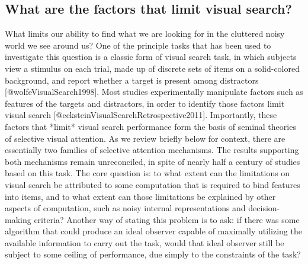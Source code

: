 \documentclass[10pt,letterpaper]{article}
\begin{document}
\subsection{What are the factors that limit visual search?}
What limits our ability to find what we are looking for in the cluttered noisy world we 
see around us? One of the principle tasks that has been used to investigate this question
is a classic form of visual search task, in which subjects view a stimulus on each trial, 
made up of discrete sets of items on a solid-colored background, and report whether a 
target is present among distractors [@wolfeVisualSearch1998]. 
Most studies experimentally manipulate factors such as features of the targets and 
distractors, in order to identify those factors limit visual search 
[@ecksteinVisualSearchRetrospective2011]. Importantly, these factors that *limit* visual 
search performance form the basis of seminal theories of selective visual attention. 
As we review briefly below for context, there are essentially two families of selective 
attention mechanisms. The results supporting both mechanisms remain unreconciled, in spite
of nearly half a century of studies based on this task. The core question is: to what 
extent can the limitations on visual search be attributed to some computation that is 
required to bind features into items, and to what extent can those limitations be 
explained by other aspects of computation, such as noisy internal representations and 
decision-making criteria? Another way of stating this problem is to ask: if there 
was some algorithm that could produce an ideal observer capable of maximally utilizing 
the available information to carry out the task, would that ideal observer still be 
subject to some ceiling of performance, due simply to the constraints of the task?
\end{document}
